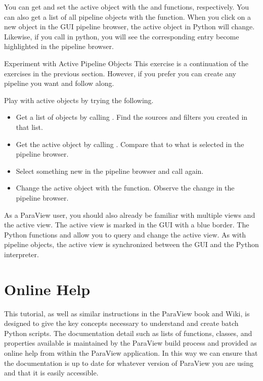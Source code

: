 You can get and set the active object with the  and
 functions, respectively.  You can also get a list
of all pipeline objects with the  function.  When you
click on a new object in the GUI pipeline browser, the active object in
Python will change.  Likewise, if you call  in
python, you will see the corresponding entry become highlighted in the
pipeline browser.

\begin{exercise}{Experiment with Active Pipeline Objects}
  \label{ex:ExperimentWithActivePipelineObjects}%
  This exercise is a continuation of the exercises in the previous
  section.  However, if you prefer you can create any pipeline you want and
  follow along.

  Play with active objects by trying the following.
  \begin{itemize}
  \item Get a list of objects by calling
    .  Find the sources and
    filters you created in that list.
  \item Get the active object by calling
    .  Compare that
    to what is selected in the pipeline browser.
  \item Select something new in the pipeline browser and call
     again.
  \item Change the active object with the 
    function.  Observe the change in the pipeline browser.
  \end{itemize}
\end{exercise}

As a ParaView user, you should also already be familiar with multiple views
and the active view.  The active view is marked in the GUI with a blue
border.  The Python functions  and
 allow you to query and change the active view.  As
with pipeline objects, the active view is synchronized between the GUI and
the Python interpreter.


\section{Online Help}
\label{sec:OnlineHelp}

This tutorial, as well as similar instructions in the ParaView book and
Wiki, is designed to give the key concepts necessary to understand and
create batch Python scripts.  The documentation detail such as lists of
functions, classes, and properties available is maintained by the ParaView
build process and provided as online help from within the ParaView
application.  In this way we can ensure that the documentation is up to
date for whatever version of ParaView you are using and that it is easily
accessible.

